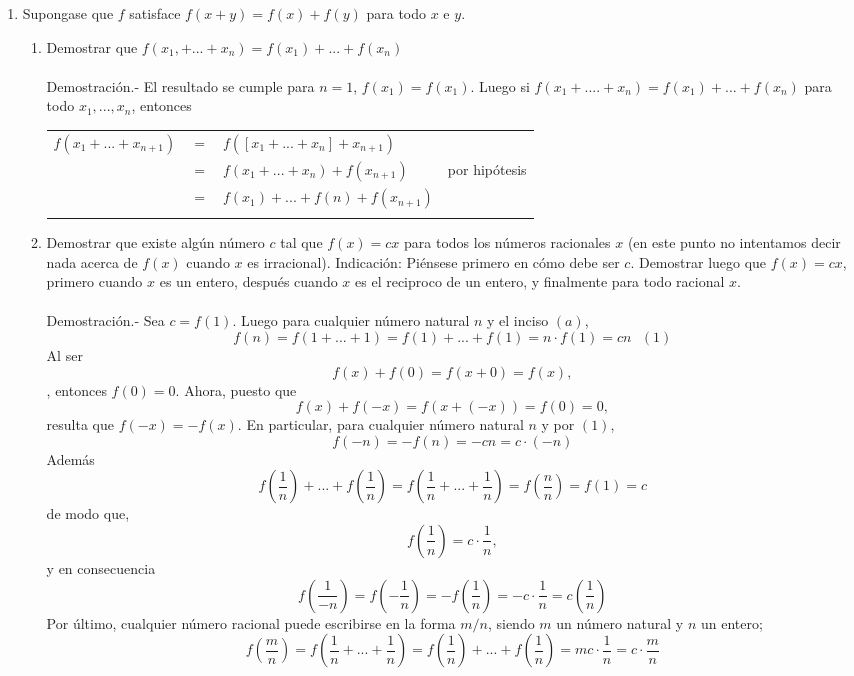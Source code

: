 \begin{enumerate}
\begin{enumerate}[\bfseries (a)]
	\end{enumerate}

	\item Supongase que $f$ satisface $f(x+y)=f(x)+f(y)$ para todo $x$ e $y$. 

	\begin{enumerate}[\bfseries (a)]

	    \item Demostrar que $f(x_1,+...+x_n)=f(x_1)+...+f(x_n)$\\\\
	    Demostración.-\; El resultado se cumple para $n=1$, $f(x_1)=f(x_1)$. Luego si $f(x_1 + .... + x_n)=f(x_1)+ ... + f(x_n)$ para todo $x_1,...,x_n$, entonces
	    \begin{center}
		\begin{tabular}{rcll}
		    $f(x_1 + ... + x_{n+1})$ & $=$ & $f(\left[x_1 + ... + x_n\right]+x_{n+1})$&\\
		       & $=$ & $f(x_1 + ... + x_n) + f(x_{n+1})$&por hipótesis\\
		       & $=$ & $f(x_1)+...+f(n)+f(x_{n+1})$&\\\\
		\end{tabular}
	    \end{center}

	    \item Demostrar que existe algún número $c$ tal que $f(x)=cx$ para todos los números racionales $x$ (en este punto no intentamos decir nada acerca de $f(x)$ cuando $x$ es irracional). Indicación: Piénsese primero en cómo debe ser $c$. Demostrar luego que $f(x)=cx$, primero cuando $x$ es un entero, después cuando $x$ es el reciproco de un entero, y finalmente para todo racional $x$.\\\\
	    Demostración.-\; Sea $c=f(1)$. Luego para cualquier número natural $n$ y el inciso $(a)$,  $$f(n)=f(1+...+1)=f(1)+...+f(1)=n\cdot f(1)=cn \,\,\,\, (1)$$ 
	    Al ser $$f(x)+f(0)=f(x+0)=f(x),$$, entonces $f(0)=0$. Ahora, puesto que $$f(x)+f(-x)=f(x+(-x))=f(0)=0,$$ 
	    resulta que $f(-x)=-f(x)$. En particular, para cualquier número natural $n$ y por $(1)$, $$f(-n)=-f(n)=-cn=c\cdot (-n)$$
	    Además $$f\left(\dfrac{1}{n}\right) + ... + f\left(\dfrac{1}{n}\right)=f\left(\dfrac{1}{n} + ... + \dfrac{1}{n}\right)=f\left( \dfrac{n}{n}\right)=f(1)=c$$ de modo que, $$f\left(\dfrac{1}{n}\right)=c\cdot \dfrac{1}{n},$$
	    y en consecuencia $$f\left(\dfrac{1}{-n}\right)=f\left(- \dfrac{1}{n}\right)=-f\left(\dfrac{1}{n}\right)=-c \cdot \dfrac{1}{n} = c \left(\dfrac{1}{n}\right)$$
	    Por último, cualquier número racional puede escribirse en la forma $m/n$, siendo $m$ un número natural y $n$ un entero;
	    $$f\left(\dfrac{m}{n}\right)=f\left(\dfrac{1}{n} + ... + \dfrac{1}{n}\right)=f\left(\dfrac{1}{n}\right) + ... + f\left(\dfrac{1}{n}\right)=mc\cdot \dfrac{1}{n}=c\cdot \dfrac{m}{n}$$\\\\


\end{enumerate}
\end{enumerate}
